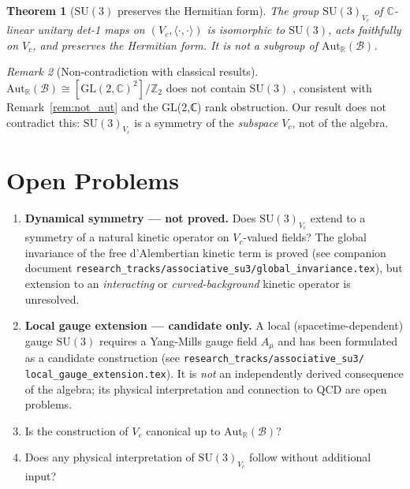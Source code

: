 \documentclass[12pt,a4paper]{article}
\newtheorem{theorem}{Theorem}[section]
\theoremstyle{remark}
\newtheorem{remark}[theorem]{Remark}
\begin{document}
\begin{theorem}[$\mathrm{SU}(3)$ preserves the Hermitian form]
  \label{thm:su3_action}
  The group $\mathrm{SU}(3)_{V_c}$ of $\mathbb{C}$-linear unitary
  det-1 maps on $(V_c,\langle\cdot,\cdot\rangle)$ is isomorphic to
  $\mathrm{SU}(3)$, acts faithfully on $V_c$, and preserves the Hermitian
  form.  It is \emph{not} a subgroup of $\mathrm{Aut}_\mathbb{R}(\mathcal{B})$.
\end{theorem}

\begin{remark}[Non-contradiction with classical results]
  $\mathrm{Aut}_\mathbb{R}(\mathcal{B})\cong[\mathrm{GL}(2,\mathbb{C})^2]/\mathbb{Z}_2$
  does not contain $\mathrm{SU}(3)$ \cite{Porteous1995}, consistent with
  Remark~\ref{rem:not_aut} and the GL(2,ℂ) rank obstruction.
  Our result does not contradict this: $\mathrm{SU}(3)_{V_c}$ is a symmetry
  of the \emph{subspace} $V_c$, not of the algebra.
\end{remark}

\section{Open Problems}
\label{sec:open}

\begin{enumerate}
  \item \textbf{Dynamical symmetry — not proved.}
    Does $\mathrm{SU}(3)_{V_c}$ extend to a symmetry of a natural
    kinetic operator on $V_c$-valued fields?  The global invariance of the
    free d'Alembertian kinetic term is proved (see companion document
    \texttt{research\_tracks/associative\_su3/global\_invariance.tex}),
    but extension to an \emph{interacting} or \emph{curved-background}
    kinetic operator is unresolved.
  \item \textbf{Local gauge extension — candidate only.}
    A local (spacetime-dependent) gauge $\mathrm{SU}(3)$ requires a
    Yang-Mills gauge field $A_\mu$ and has been formulated as a candidate
    construction (see \texttt{research\_tracks/associative\_su3/%
    local\_gauge\_extension.tex}).  It is \emph{not} an independently
    derived consequence of the algebra; its physical interpretation and
    connection to QCD are open problems.
  \item Is the construction of $V_c$ canonical up to
    $\mathrm{Aut}_\mathbb{R}(\mathcal{B})$?
  \item Does any physical interpretation of $\mathrm{SU}(3)_{V_c}$ follow
    without additional input?
\end{enumerate}
\end{document}
